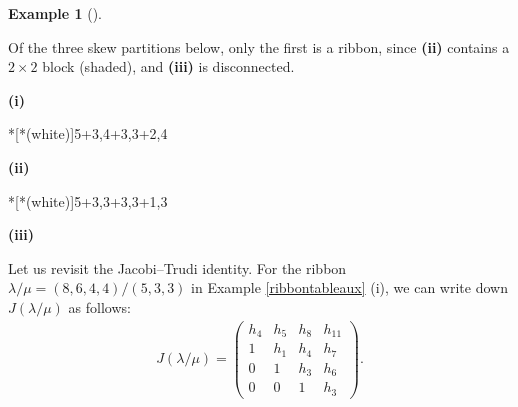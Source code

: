 \documentclass[numbers=enddot,12pt,final,onecolumn,notitlepage]{scrartcl}%
\theoremstyle{definition}
\newtheorem{exam}[theo]{Example}
\newenvironment{example}[1][]
{\begin{exam}[#1]\begin{leftbar}}
{\end{leftbar}\end{exam}}
\theoremstyle{plainsl}
\begin{document}





\begin{example}
\label{ribbontableaux}
Of the three skew partitions below, only the first is a ribbon, since \textbf{(ii)} contains a $2\times 2$ block (shaded), and \textbf{(iii)} is disconnected.

\begin{minipage}[t]{0.30\textwidth}
\begin{center}

\textbf{(i)}
\end{center}
\end{minipage}
\begin{minipage}[t]{0.30\textwidth}
\begin{center}
*[*(white)]{5+3,4+3,3+2,4}

\textbf{(ii)}
\end{center}
\end{minipage}
\begin{minipage}[t]{0.30\textwidth}
\begin{center}
*[*(white)]{5+3,3+3,3+1,3}

\textbf{(iii)}
\end{center}
\end{minipage}


\end{example}



Let us revisit the Jacobi--Trudi identity. For the ribbon  $\lambda/\mu= (8,6,4,4)/(5,3,3)$ in Example \ref{ribbontableaux} (i), we can write down $J(\lambda/\mu)$ as follows:
\begin{align*}
J(\lambda/\mu)
= %
\begin{pmatrix}
h_4 & h_5 & h_8 & h_{11} \\ 
1 & h_1 & h_4 & h_7  \\
0 & 1 & h_3 & h_6 \\
0 & 0 & 1 & h_3
\end{pmatrix} .
\end{align*}
\end{document}
